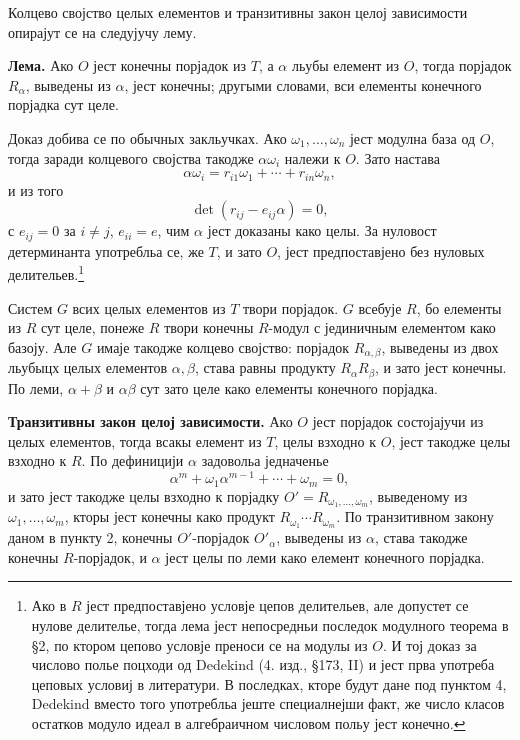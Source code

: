 ﻿\documentclass[11pt]{article}
\begin{document}
Колцево својство целых елементов и транзитивны закон целој зависимости опирајут се на следујучу лему.

\medskip
\noindent\textbf{Лема.} Ако $O$ јест конечны порјадок из $T$, а $\alpha$ льубы елемент из $O$, тогда порјадок $R_\alpha$, выведены из $\alpha$, јест конечны; другыми словами, вси елементы конечного порјадка сут целе.

Доказ добива се по обычных закльучках. Ако $\omega_1,\ldots,\omega_n$ јест модулна база од $O$, тогда заради колцевого својства такодже $\alpha\omega_i$ належи к $O$. Зато настава
\[
        \alpha\omega_i=r_{i1}\omega_1+\cdots+r_{in}\omega_n,
\]
и из того
\[
        \det(r_{ij}-e_{ij}\alpha)=0,
\]
с $e_{ij}=0$ за $i\ne j$, $e_{ii}=e$, чим $\alpha$ јест доказаны како целы. За нуловост детерминанта употребльа се, же $T$, и зато $O$, јест предпоставјено без нуловых делительев.\footnote{Ако в $R$ јест предпоставјено условје цепов делительев, але допустет се нулове делителье, тогда лема јест непосредньи последок модулного теорема в §2, по ктором цепово условје преноси се на модулы из $O$. И тој доказ за числово полье поцходи од Dedekind (4. изд., §173, II) и јест прва употреба цеповых условиј в литератури. В последках, кторе будут дане под пунктом 4, Dedekind вместо того употребльа јеште специалнејши факт, же число класов остатков модуло идеал в алгебраичном числовом польу јест конечно.}

Систем $G$ всих целых елементов из $T$ твори порјадок. $G$ всебује $R$, бо елементы из $R$ сут целе, понеже $R$ твори конечны $R$-модул с јединичным елементом како базоју. Але $G$ имаје такодже колцево својство: порјадок $R_{\alpha,\beta}$, выведены из двох льубыцх целых елементов $\alpha,\beta$, става равны продукту $R_\alpha R_\beta$, и зато јест конечны. По леми, $\alpha+\beta$ и $\alpha\beta$ сут зато целе како елементы конечного порјадка.

\medskip
\noindent\textbf{Транзитивны закон целој зависимости.} Ако $O$ јест порјадок состојајучи из целых елементов, тогда всакы елемент из $T$, целы взходно к $O$, јест такодже целы взходно к $R$. По дефиницији $\alpha$ задовольа једначенье
\[
        \alpha^m+\omega_1\alpha^{m-1}+\cdots+\omega_m=0,
\]
и зато јест такодже целы взходно к порјадку $O'=R_{\omega_1,\ldots,\omega_m}$, выведеному из $\omega_1,\ldots,\omega_m$, кторы јест конечны како продукт $R_{\omega_1}\cdots R_{\omega_m}$. По транзитивном закону даном в пункту 2, конечны $O'$-порјадок $O'_\alpha$, выведены из $\alpha$, става такодже конечны $R$-порјадок, и $\alpha$ јест целы по леми како елемент конечного порјадка.
\end{document}
